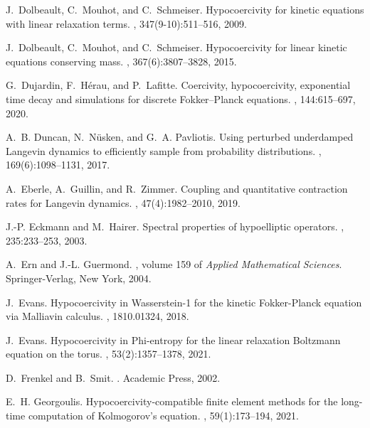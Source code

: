 \documentclass{article}
\begin{document}
\begin{thebibliography}{10}
J.~Dolbeault, C.~Mouhot, and C.~Schmeiser.
\newblock Hypocoercivity for kinetic equations with linear relaxation terms.
, 347(9-10):511--516, 2009.

J.~Dolbeault, C.~Mouhot, and C.~Schmeiser.
\newblock Hypocoercivity for linear kinetic equations conserving mass.
, 367(6):3807--3828, 2015.

G.~Dujardin, F.~H\'erau, and P.~Lafitte.
\newblock Coercivity, hypocoercivity, exponential time decay and simulations
  for discrete {Fokker–Planck} equations.
, 144:615--697, 2020.

A.~B. Duncan, N.~N\"{u}sken, and G.~A. Pavliotis.
\newblock Using perturbed underdamped {L}angevin dynamics to efficiently sample
  from probability distributions.
, 169(6):1098--1131, 2017.

A.~Eberle, A.~Guillin, and R.~Zimmer.
\newblock Coupling and quantitative contraction rates for {L}angevin dynamics.
, 47(4):1982--2010, 2019.

J.-P. Eckmann and M.~Hairer.
\newblock Spectral properties of hypoelliptic operators.
, 235:233--253, 2003.

A.~Ern and J.-L. Guermond.
, volume 159 of {\em
  Applied Mathematical Sciences}.
\newblock Springer-Verlag, New York, 2004.

J.~Evans.
\newblock Hypocoercivity in {W}asserstein-1 for the kinetic {F}okker-{P}lanck
  equation via {M}alliavin calculus.
, 1810.01324, 2018.

J.~Evans.
\newblock Hypocoercivity in {P}hi-entropy for the linear relaxation {B}oltzmann
  equation on the torus.
, 53(2):1357--1378, 2021.

D.~Frenkel and B.~Smit.
.
\newblock Academic Press, 2002.

E.~H. Georgoulis.
\newblock Hypocoercivity-compatible finite element methods for the long-time
  computation of {K}olmogorov's equation.
, 59(1):173--194, 2021.


\end{thebibliography}
\end{document}
